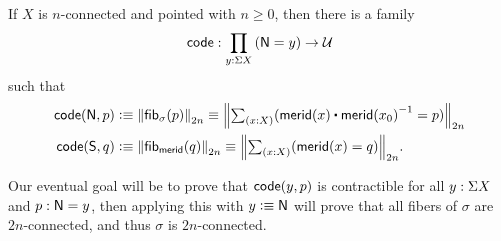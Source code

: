 \begin{lem}\label{thm:freudcode}
  If $X$ is $n$-connected and pointed with $n\geq 0$, then there is a family
  \begin{equation}
    \code:\prd{y:\susp X} (\north=y) \to \type\label{eq:freudcode}
  \end{equation}
  such that
  \begin{align}
    \code(\north,p) &\defeq \trunc{2n}{\hfib{\sigma}{p}}
    \jdeq \trunc{2n}{\tsm{x:X} (\merid(x) \ct \opp{\merid(x_0)} = p)}\label{eq:freudcodeN}\\
    \code(\south,q) &\defeq \trunc{2n}{\hfib{\merid}{q}}
    \jdeq \trunc{2n}{\tsm{x:X} (\merid(x) = q)}.\label{eq:freudcodeS}
  \end{align}
\end{lem}

Our eventual goal will be to prove that $\mathsf{code}(y,p)$ is contractible for all $y:\Sigma X$ and $p:\mathsf{N}=y$, then applying this with $y\vcentcolon\equiv \mathsf{N}$ will prove that all fibers of $\sigma$ are $2n$-connected, and thus $\sigma$ is $2n$-connected.

